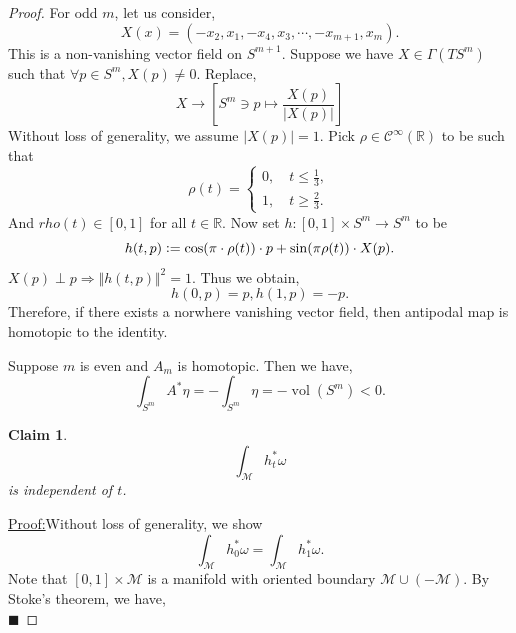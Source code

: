 \documentclass[10pt]{article}
\newtheorem{claim}{Claim}
\newenvironment{claimproof}[1]{\par\noindent\underline{Proof:}\space#1}{\hfill $\blacksquare$}
\DeclareMathOperator{\vol}{vol}
\newcommand{\defeq}{\vcentcolon=}
\newcommand{\norm}[1]{\Vert #1 \Vert}
\newcommand{\R}[0]{\mathbb{R}}
\newcommand{\M}[0]{\mathcal{M}}
\newcommand{\cinf}[0]{\mathcal{C}^\infty}
\begin{document}
\begin{proof}
  For odd $m$, let us consider,
  \begin{equation*}
    X(x) = (-x_2,x_1,-x_4,x_3,\cdots,-x_{m+1},x_m).
  \end{equation*}
  This is a non-vanishing vector field on $S^{m+1}$. Suppose we have $X\in\Gamma(TS^m)$ such that $\forall p\in S^m,X(p)\not=0$. Replace,
  \begin{equation*}
    X\to \left[S^m\ni p\mapsto {\frac {X(p)}{\vert X(p)\vert}}\right]
  \end{equation*}
  Without loss of generality, we assume $\vert X(p)\vert = 1$. Pick $\rho\in\cinf(\R)$ to be such that 
  \begin{equation*}
    \rho(t) = \begin{cases}
      0,\quad t\leq {\frac 1 3},\\
      1,\quad t\geq{\frac 2 3}.
    \end{cases}
  \end{equation*}
  And $rho(t)\in[0,1]$ for all $t\in\R$. Now set $h:[0,1]\times S^m\to S^m$ to be
  \begin{equation*}
    h(t,p)\defeq\cos(\pi\cdot\rho(t))\cdot p+\sin(\pi\rho(t))\cdot X(p).
  \end{equation*}
  $X(p)\perp p\Rightarrow \norm{h(t,p)}^2=1$. Thus we obtain,
  \begin{equation*}
    h(0,p) = p,h(1,p) = -p.
  \end{equation*}
  Therefore, if there exists a norwhere vanishing vector field, then antipodal map is homotopic to the identity.
  \par Suppose $m$ is even and $A_m$ is homotopic. 
  Then we have,
  \begin{equation*}
    \int_{S^m}A^*\eta = -\int_{S^m}\eta = -\vol(S^m)<0.
  \end{equation*}
  \begin{claim}
    \begin{equation*}
      \int_\M h_t^*\omega
    \end{equation*}
    is independent of $t$. 
  \end{claim}
  \begin{claimproof}
    Without loss of generality, we show 
    \begin{equation*}
      \int_\M h^*_0\omega = \int_\M h^*_1\omega.
    \end{equation*}
    Note that $[0,1]\times \M$ is a manifold with oriented boundary $\M\cup(-\M)$. By Stoke's theorem, we have,
    \begin{equation*}

\end{equation*}
\end{claimproof}
\end{proof}
\end{document}
